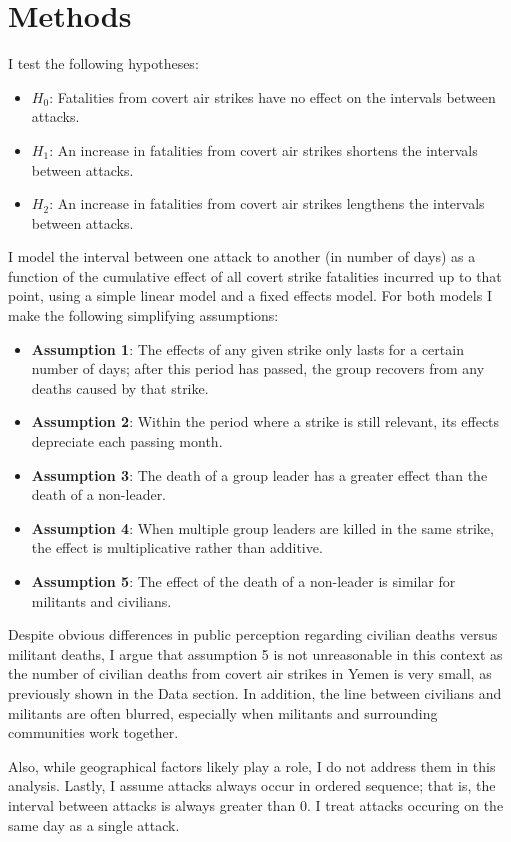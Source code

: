 \documentclass[letterpaper,12pt]{article}
\theoremstyle{definition}
\begin{document}
\section{Methods}
I test the following hypotheses:
\begin{itemize}
  \item $H_0$: Fatalities from covert air strikes have no effect on the intervals between attacks.
  \item $H_1$: An increase in fatalities from covert air strikes shortens the intervals between attacks.
  \item $H_2$: An increase in fatalities from covert air strikes lengthens the intervals between attacks.
\end{itemize}
I model the interval between one attack to another (in number of days) as a function of the cumulative effect of all covert strike fatalities incurred up to that point, using a simple linear model and a fixed effects model. For both models I make the following simplifying assumptions:
\begin{itemize}
  \item \textbf{Assumption 1}: The effects of any given strike only lasts for a certain number of days; after this period has passed, the group recovers from any deaths caused by that strike.
  \item \textbf{Assumption 2}: Within the period where a strike is still relevant, its effects depreciate each passing month.
  \item \textbf{Assumption 3}: The death of a group leader has a greater effect than the death of a non-leader.
  \item \textbf{Assumption 4}: When multiple group leaders are killed in the same strike, the effect is multiplicative rather than additive.
  \item \textbf{Assumption 5}: The effect of the death of a non-leader is similar for militants and civilians.
\end{itemize}
Despite obvious differences in public perception regarding civilian deaths versus militant deaths, I argue that assumption 5 is not unreasonable in this context as the number of civilian deaths from covert air strikes in Yemen is very small, as previously shown in the Data section. In addition, the line between civilians and militants are often blurred, especially when militants and surrounding communities work together.

Also, while geographical factors likely play a role, I do not address them in this analysis. Lastly, I assume attacks always occur in ordered sequence; that is, the interval between attacks is always greater than 0. I treat attacks occuring on the same day as a single attack. 
\end{document}
